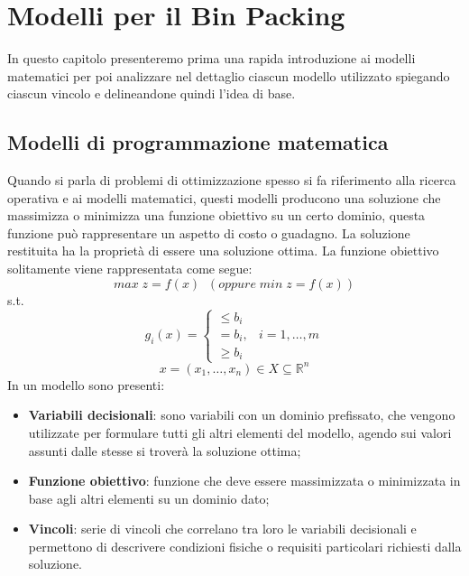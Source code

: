
\hypertarget{(chap:capitolo4)}{}
\chapter{Modelli per il Bin Packing}
In questo capitolo presenteremo prima una rapida introduzione ai modelli matematici per poi analizzare nel dettaglio ciascun modello utilizzato spiegando ciascun vincolo e delineandone quindi l'idea di base.
\section{Modelli di programmazione matematica}
Quando si parla di problemi di ottimizzazione spesso si fa riferimento alla ricerca operativa e ai modelli matematici, questi modelli producono una soluzione che massimizza o minimizza una funzione obiettivo su un certo dominio, questa funzione può rappresentare un aspetto di costo o guadagno. 
La soluzione restituita ha la proprietà di essere una soluzione ottima. La funzione obiettivo solitamente viene rappresentata come segue:
$$ max\; z = f ( x )\;\; (oppure\; min\; z = f ( x ))$$
s.t.
$$g_i (x) = \begin{cases} \leq b_i \\ = b_i, & i = 1,\dots,m \\ \geq b_i \end{cases}$$
$$x = (x_1,\dots,x_n) \in X \subseteq \mathbb{R}^n$$
In un modello sono presenti:
\begin{itemize}
	\item \textbf{Variabili decisionali}: sono variabili con un dominio prefissato, che vengono utilizzate per formulare tutti gli altri elementi del modello, agendo sui valori assunti dalle stesse si troverà la soluzione ottima;
	\item \textbf{Funzione obiettivo}: funzione che deve essere massimizzata o minimizzata in base agli altri elementi su un dominio dato;
	\item \textbf{Vincoli}: serie di vincoli che correlano tra loro le variabili decisionali e permettono di descrivere condizioni fisiche o requisiti particolari richiesti dalla soluzione.
\end{itemize}

